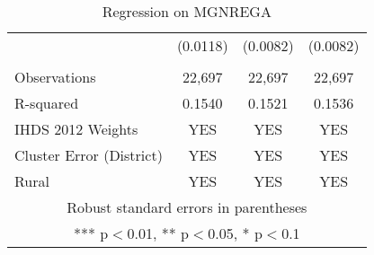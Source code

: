 \documentclass{article}
\begin{document}
\begin{table}[]
\begin{tabular}{lccc}
 & (0.0118) & (0.0082) & (0.0082) \\
 &  &  &  \\
Observations & 22,697 & 22,697 & 22,697 \\
 R-squared & 0.1540 & 0.1521 & 0.1536 \\ 
  IHDS 2012 Weights & YES & YES & YES \\
Cluster Error (District) & YES & YES & YES \\
Rural & YES & YES & YES \\\hline
\multicolumn{4}{c}{ Robust standard errors in parentheses} \\
\multicolumn{4}{c}{ *** p$<$0.01, ** p$<$0.05, * p$<$0.1} \\
\end{tabular}
    \caption{Regression on MGNREGA}
    \label{tabA}
\end{table} 
\end{document}
